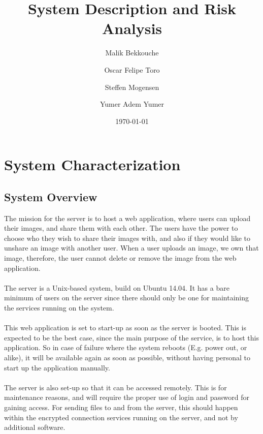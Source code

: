 \documentclass{article}
\title{\huge\sffamily\bfseries System Description and Risk Analysis}
\author{Malik Bekkouche \and Oscar Felipe Toro \and Steffen Mogensen \and  Yumer Adem Yumer}
\date{\today}
\begin{document}
\maketitle


\tableofcontents
\pagebreak


\section{System Characterization}

\subsection{System Overview}
The mission for the server is to host a web application, where users can upload their images, and share them with each other. The users have the power to choose who they wish to share their images with, and also if they would like to unshare an image with another user. When a user uploads an image, we own that image, therefore, the user cannot delete or remove the image from the web application.\\ \\
The server is a Unix-based system, build on Ubuntu 14.04. It has a bare minimum of users on the server since there should only be one for maintaining the services running on the system.\\ \\
This web application is set to start-up as soon as the server is booted. This is expected to be the best case, since the main purpose of the service, is to host this application. So in case of failure where the system reboots (E.g. power out, or alike), it will be available again as soon as possible, without having personal to start up the application manually.\\ \\
The server is also set-up so that it can be accessed remotely. This is for maintenance reasons, and will require the proper use of login and password for gaining access.
For sending files to and from the server, this should happen within the encrypted connection services running on the server, and not by additional software.
\end{document}
